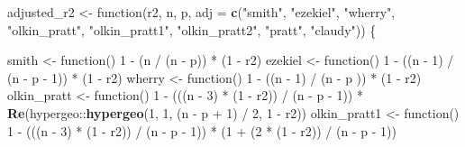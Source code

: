 \documentclass[]{article}
\newenvironment{Shaded}{\begin{snugshade}}{\end{snugshade}}
\newcommand{\KeywordTok}[1]{\textcolor[rgb]{0.13,0.29,0.53}{\textbf{{#1}}}}
\newcommand{\DataTypeTok}[1]{\textcolor[rgb]{0.13,0.29,0.53}{{#1}}}
\newcommand{\DecValTok}[1]{\textcolor[rgb]{0.00,0.00,0.81}{{#1}}}
\newcommand{\StringTok}[1]{\textcolor[rgb]{0.31,0.60,0.02}{{#1}}}
\newcommand{\NormalTok}[1]{{#1}}
\begin{document}
\begin{Shaded}
\begin{Highlighting}[]
\NormalTok{adjusted_r2 <-}\StringTok{ }\NormalTok{function(r2, n, p, }\DataTypeTok{adj =} \KeywordTok{c}\NormalTok{(}\StringTok{"smith"}\NormalTok{, }\StringTok{"ezekiel"}\NormalTok{, }\StringTok{"wherry"}\NormalTok{, }\StringTok{"olkin_pratt"}\NormalTok{, }\StringTok{"olkin_pratt1"}\NormalTok{, }
                                          \StringTok{"olkin_pratt2"}\NormalTok{, }\StringTok{"pratt"}\NormalTok{, }\StringTok{"claudy"}\NormalTok{)) \{}
  
  \NormalTok{smith        <-}\StringTok{ }\NormalTok{function() }\DecValTok{1} \NormalTok{-}\StringTok{ }\NormalTok{(n       /}\StringTok{ }\NormalTok{(n -}\StringTok{ }\NormalTok{p))     *}\StringTok{ }\NormalTok{(}\DecValTok{1} \NormalTok{-}\StringTok{ }\NormalTok{r2)}
  \NormalTok{ezekiel      <-}\StringTok{ }\NormalTok{function() }\DecValTok{1} \NormalTok{-}\StringTok{ }\NormalTok{((n -}\StringTok{ }\DecValTok{1}\NormalTok{) /}\StringTok{ }\NormalTok{(n -}\StringTok{ }\NormalTok{p -}\StringTok{ }\DecValTok{1}\NormalTok{)) *}\StringTok{ }\NormalTok{(}\DecValTok{1} \NormalTok{-}\StringTok{ }\NormalTok{r2)}
  \NormalTok{wherry       <-}\StringTok{ }\NormalTok{function() }\DecValTok{1} \NormalTok{-}\StringTok{ }\NormalTok{((n -}\StringTok{ }\DecValTok{1}\NormalTok{) /}\StringTok{ }\NormalTok{(n -}\StringTok{ }\NormalTok{p    )) *}\StringTok{ }\NormalTok{(}\DecValTok{1} \NormalTok{-}\StringTok{ }\NormalTok{r2)}
  \NormalTok{olkin_pratt  <-}\StringTok{ }\NormalTok{function() }\DecValTok{1} \NormalTok{-}\StringTok{ }\NormalTok{(((n -}\StringTok{ }\DecValTok{3}\NormalTok{) *}\StringTok{ }\NormalTok{(}\DecValTok{1} \NormalTok{-}\StringTok{ }\NormalTok{r2)) /}\StringTok{ }\NormalTok{(n -}\StringTok{ }\NormalTok{p -}\StringTok{ }\DecValTok{1}\NormalTok{)) *}\StringTok{ }\KeywordTok{Re}\NormalTok{(hypergeo::}\KeywordTok{hypergeo}\NormalTok{(}\DecValTok{1}\NormalTok{, }\DecValTok{1}\NormalTok{, (n -}\StringTok{ }\NormalTok{p +}\StringTok{ }\DecValTok{1}\NormalTok{) /}\StringTok{ }\DecValTok{2}\NormalTok{, }\DecValTok{1} \NormalTok{-}\StringTok{ }\NormalTok{r2))}
  \NormalTok{olkin_pratt1 <-}\StringTok{ }\NormalTok{function() }\DecValTok{1} \NormalTok{-}\StringTok{ }\NormalTok{(((n -}\StringTok{ }\DecValTok{3}\NormalTok{) *}\StringTok{ }\NormalTok{(}\DecValTok{1} \NormalTok{-}\StringTok{ }\NormalTok{r2)) /}\StringTok{ }\NormalTok{(n -}\StringTok{ }\NormalTok{p -}\StringTok{ }\DecValTok{1}\NormalTok{)) *}\StringTok{  }\NormalTok{(}\DecValTok{1} \NormalTok{+}\StringTok{ }\NormalTok{(}\DecValTok{2} \NormalTok{*}\StringTok{ }\NormalTok{(}\DecValTok{1} \NormalTok{-}\StringTok{ }\NormalTok{r2)) /}\StringTok{ }\NormalTok{(n -}\StringTok{ }\NormalTok{p -}\StringTok{ }\DecValTok{1}\NormalTok{))}

\end{Highlighting}
\end{Shaded}
\end{document}
